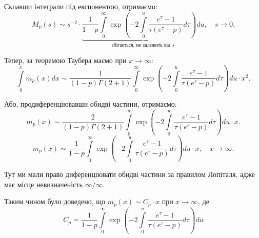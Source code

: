 Склавши інтеграли під експонентою, отримаємо:
\begin{equation}
M_p(s) \sim s^{-2} \cdot \underbrace{\frac{1}{1-p} \int\limits_0^\infty \exp\left( -2\int\limits_0^u \frac{e^{\tau} - 1}{\tau(e^\tau - p)} d\tau  \right) du}_{\text{збігається, не залежить від } s}, \quad s \rightarrow 0.
\end{equation}

Тепер, за теоремою Таубера маємо при $x \rightarrow \infty$:
\begin{equation}
\int\limits_0^x m_p(x) dx \sim \frac{1}{(1-p)\Gamma(2 + 1)} \int\limits_0^\infty \exp\left( -2\int\limits_0^u \frac{e^{\tau} - 1}{\tau(e^\tau - p)} d\tau  \right) du \cdot x^2.
\end{equation}

Або, продиференціювавши обидві частини,  отримаємо:
\begin{equation}
m_p(x) \sim \frac{2}{(1- p) \Gamma(2 + 1)} \int\limits_0^\infty \exp\left( -2\int\limits_0^u \frac{e^{\tau} - 1}{\tau(e^\tau - p)} d\tau  \right) du \cdot x.
\end{equation}
\begin{equation}
\label{eq:model_final}
m_p(x) \sim \frac{1}{1-p} \int\limits_0^\infty \exp\left( -2\int\limits_0^u \frac{e^{\tau} - 1}{\tau(e^\tau - p)} d\tau  \right) du \cdot x, \quad x \rightarrow \infty.
\end{equation}

Тут ми мали право диференціювати обидві частини за правилом Лопіталя, адже має місце невизначеність $\infty / \infty$.

Таким чином було доведено, що $m_{p}(x) \sim C_{p} \cdot x$ при $x \rightarrow \infty$, де
\begin{equation}
C_{p} = \frac{1}{1-p} \int\limits_0^\infty \exp\left( -2\int\limits_0^u \frac{e^{\tau} - 1}{\tau(e^\tau - p)} d\tau  \right) du
\end{equation}